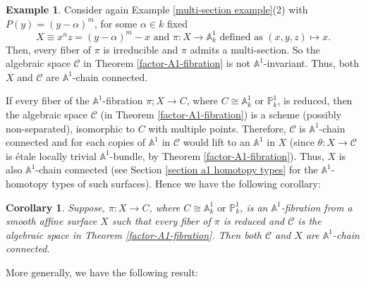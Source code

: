\documentclass[11pt, reqno]{amsart}
\theoremstyle{plain}
\newtheorem{lemma}[thm]{Lemma}
\newtheorem{corollary}[thm]{Corollary}
\theoremstyle{definition}
\newtheorem{example}[thm]{Example}
\newcommand{\sC}{{\mathcal C}}
\newcommand{\A}{{\mathbb A}}
\renewcommand{\P}{{\mathbb P}}
\begin{document}
\begin{example}
Consider again Example \ref{multi-section example}(2) with $P(y) = (y-\alpha)^m$, for some $\alpha \in k$  fixed \cite[Example 5]{doub}
 $$X \equiv x^nz=(y-\alpha)^m-x \text{ and } \pi: X \to \A^1_k \text{ defined as }(x,y,z)\mapsto x.$$
Then, every fiber of $\pi$ is irreducible and $\pi$ admits a multi-section. So the algebraic space $\sC$ in Theorem \ref{factor-A1-fibration} is not $\A^1$-invariant. Thus, both $X$ and $\sC$ are $\A^1$-chain connected.
\end{example}

If every fiber of the $\A^1$-fibration $\pi; X \to C$, where $C \cong \A^1_k \text{ or } \P^1_k$, is reduced, then the algebraic space $\sC$ (in Theorem \ref{factor-A1-fibration}) is a scheme (possibly non-separated), 
isomorphic to $C$ with multiple points. Therefore, $\sC$ is $\A^1$-chain connected and for each copies of $\A^1$ in $\sC$ would lift to an $\A^1$ in $X$ (since $\theta: X \to \sC$ is \'etale locally trivial $\A^1$-bundle, by Theorem \ref{factor-A1-fibration}). Thus, $X$ is also $\A^1$-chain connected (see Section \ref{section a1 homotopy types} for the $\A^1$-homotopy types of such surfaces). Hence we have the following corollary:
\begin{corollary}
    Suppose, $\pi:X \to C$, where $C \cong \A^1_k \text{ or } \P^1_k$, is an $\mathbb{A}^1$-fibration from a smooth affine surface $X$ such that every fiber of $\pi$ is reduced and $\sC$ is the algebraic space in Theorem \ref{factor-A1-fibration}. Then both $\sC$ and $X$ are $\A^1$-chain connected.
\end{corollary}
More generally, 
we have the following result:
\end{document}
